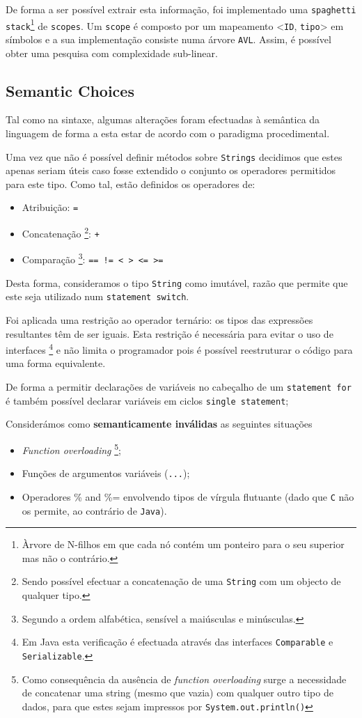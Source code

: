 \documentclass[a4paper]{article}
\begin{document}
\indent De forma a ser possível extrair esta informação, foi implementado uma \texttt{spaghetti stack}\footnote[1]{Àrvore de N-filhos em que cada nó contém um ponteiro para o seu superior mas não o contrário.} de \texttt{scopes}.
Um \texttt{scope} é composto por um mapeamento <\texttt{ID}, \texttt{tipo}> em símbolos e a sua implementação consiste numa árvore \texttt{AVL}. Assim, é 
possível obter uma pesquisa com complexidade sub-linear.

\cleardoublepage
\subsection{Semantic Choices}
\label{semantic_choices}
\indent \indent Tal como na sintaxe, algumas alterações foram efectuadas 
à semântica da linguagem de forma a esta estar de acordo com o paradigma procedimental. 

\indent Uma vez que não é possível definir métodos sobre \texttt{Strings} decidimos que estes apenas seriam úteis
caso fosse extendido o conjunto os operadores permitidos para este tipo. Como tal, estão definidos os operadores de:
\begin{itemize}
	\item Atribuição: \quad \verb!=! 
  	\item Concatenação \footnote[2]{Sendo possível efectuar a concatenação de uma \texttt{String} com um objecto de qualquer tipo.}: \quad \verb!+! 
	\item Comparação \footnote[3]{Segundo a ordem alfabética, sensível a maiúsculas e minúsculas.}: \quad \verb|== != < > <= >=|
\end{itemize}

\indent Desta forma, consideramos o tipo \texttt{String} como imutável, razão que permite que este seja utilizado num
\texttt{statement switch}.

\indent Foi aplicada uma restrição ao operador ternário: os tipos das expressões resultantes têm de ser iguais.
Esta restrição é necessária para evitar o uso de interfaces \footnote[4]{Em Java esta verificação é efectuada através das interfaces \texttt{Comparable} e \texttt{Serializable}.}
e não limita o programador pois é possível reestruturar o código para uma forma equivalente.

\indent De forma a permitir declarações de variáveis no cabeçalho de um \texttt{statement for} é também possível declarar variáveis em ciclos \texttt{single statement};

\indent Considerámos como \textbf{semanticamente inválidas} as seguintes situações
\begin{itemize}
	\item \textit{Function overloading} \footnote[5]{Como consequência da ausência de \textit{function overloading} surge a necessidade de concatenar
		uma string (mesmo que vazia) com qualquer outro tipo de dados, para que estes sejam impressos por \texttt{System.out.println()}};
	\item Funções de argumentos variáveis (\texttt{...});
	\item Operadores \% and \%= envolvendo tipos de vírgula flutuante (dado que \texttt{C} não os permite, ao contrário de \texttt{Java}).
\end{itemize}
\end{document}
